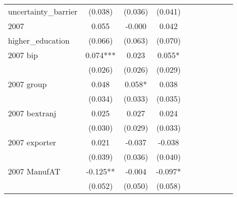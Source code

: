 \begin{table}[htbp]
\begin{tabular}{l*{9}{c}}
uncertainty\_barrier &     (0.038)   &     (0.036)   &     (0.041)   &               &               &               &               &               &               \\
2007                &       0.055   &      -0.000   &       0.042   &               &               &               &               &               &               \\
higher\_education    &     (0.066)   &     (0.063)   &     (0.070)   &               &               &               &               &               &               \\
2007 bip            &       0.074***&       0.023   &       0.055*  &               &               &               &               &               &               \\
                    &     (0.026)   &     (0.026)   &     (0.029)   &               &               &               &               &               &               \\
2007 group          &       0.048   &       0.058*  &       0.038   &               &               &               &               &               &               \\
                    &     (0.034)   &     (0.033)   &     (0.035)   &               &               &               &               &               &               \\
2007 bextranj       &       0.025   &       0.027   &       0.024   &               &               &               &               &               &               \\
                    &     (0.030)   &     (0.029)   &     (0.033)   &               &               &               &               &               &               \\
2007 exporter       &       0.021   &      -0.037   &      -0.038   &               &               &               &               &               &               \\
                    &     (0.039)   &     (0.036)   &     (0.040)   &               &               &               &               &               &               \\
2007 ManufAT        &      -0.125** &      -0.004   &      -0.097*  &               &               &               &               &               &               \\
                    &     (0.052)   &     (0.050)   &     (0.058)   &               &               &               &               &               &               \\

\end{tabular}
\end{table}
